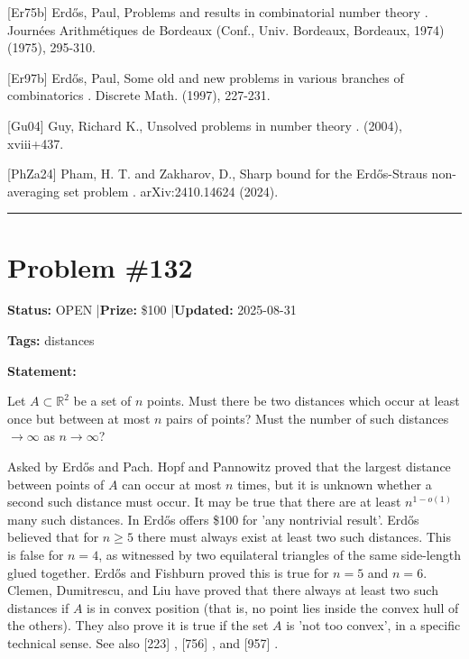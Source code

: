 \documentclass{article}
\begin{document}
[Er75b] Erd\H{o}s, Paul, Problems and results in combinatorial number theory . Journ\'{e}es Arithm\'{e}tiques de Bordeaux (Conf., Univ. Bordeaux, Bordeaux, 1974) (1975), 295-310.

[Er97b] Erd\H{o}s, Paul, Some old and new problems in various branches of combinatorics . Discrete Math. (1997), 227-231.

[Gu04] Guy, Richard K., Unsolved problems in number theory . (2004), xviii+437.

[PhZa24] Pham, H. T. and Zakharov, D., Sharp bound for the Erd\H{o}s-Straus non-averaging set problem . arXiv:2410.14624 (2024).

\noindent\rule{\linewidth}{0.4pt}


\section{Problem \#132}
\label{prob:132}

\noindent\textbf{Status:} OPEN \quad|\quad \textbf{Prize:} \$100 \quad|\quad \textbf{Updated:} 2025-08-31

\noindent\textbf{Tags:} distances

\medskip

\noindent\textbf{Statement:}

Let $A\subset \mathbb{R}^2$ be a set of $n$ points. Must there be two distances which occur at least once but between at most $n$ pairs of points? Must the number of such distances $\to \infty$ as $n\to \infty$?




Asked by Erd\H{o}s and Pach. Hopf and Pannowitz \cite{HoPa34} proved that the largest distance between points of $A$ can occur at most $n$ times, but it is unknown whether a second such distance must occur. It may be true that there are at least $n^{1-o(1)}$ many such distances. In \cite{Er97e} Erd\H{o}s offers \$100 for 'any nontrivial result'. Erd\H{o}s \cite{Er84c} believed that for $n\geq 5$ there must always exist at least two such distances. This is false for $n=4$, as witnessed by two equilateral triangles of the same side-length glued together. Erd\H{o}s and Fishburn \cite{ErFi95} proved this is true for $n=5$ and $n=6$. Clemen, Dumitrescu, and Liu \cite{CDL25} have proved that there always at least two such distances if $A$ is in convex position (that is, no point lies inside the convex hull of the others). They also prove it is true if the set $A$ is 'not too convex', in a specific technical sense. See also [223] , [756] , and [957] .
\end{document}
